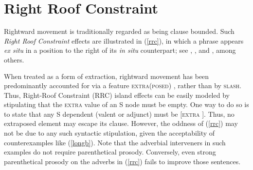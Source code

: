 \documentclass[output=paper
 	        ,biblatex
                ,babelshorthands
                ,newtxmath
                ,draftmode
                ,colorlinks, citecolor=brown
]{langscibook}
\begin{document}



\zl
{}


\section{Right Roof Constraint}

Rightward movement is traditionally regarded as being clause bounded. Such \emph{Right Roof
    Constraint} \citep[Section~5.1.2]{Ross67} effects are illustrated in (\ref{rrc}), in which a
phrase appears \emph{ex situ} in a position to the right of its \emph{in situ} counterpart; see
\citet{akma75}, \citet{baltin78}, and \citet{stowelldiss}, among others.

\eal \label{rrc}
\ex[*]{It was believed \trace$_i$ that [there walked into the room \trace$_j$ ]  [by everyone]$_i$ [a man with  long blond hair]$_j$].\footnote{
\citew[\page 386]{rochemont}}}
\zl



\noindent
When treated as a form of extraction, rightward movement has been predominantly accounted for via a
feature \textsc{extra(posed)} \parencites{kellerverb,Keller95b,Bouma96,eynde96}[Section~13.2]{Mueller99a}{KimSag2005},
rather than by \textsc{slash}.  Thus, Right-Roof Constraint (RRC) island effects can be easily modeled
by stipulating that the \textsc{extra} value of an S node must be empty. One way to do so is to state
that any S dependent (valent or adjunct) must be [\textsc{extra} \eliste].  Thus, no extraposed element
may escape its clause. However, the oddness of (\ref{rrc}) may not be due to any such syntactic
stipulation, given the acceptability of counterexamples like (\ref{longb}). Note that the adverbial
interveners in such examples do not require parenthetical prosody. Conversely, even strong
parenthetical prosody on the adverbs in (\ref{rrc}) fails to improve those sentences.
\end{document}
